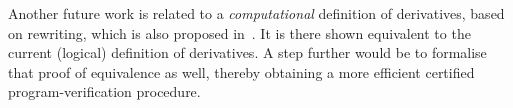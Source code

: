 \documentclass[conference]{IEEEtran}
\newenvironment{todo}{\medskip\hrule\smallskip\noindent}{\smallskip\hrule\medskip}
\newcommand{\dl}[1]{\begin{todo}\textcolor{blue}{Dorel:}\\ \color{red}{#1}\color{black}\end{todo}}
\newcommand{\vr}[1]{\begin{todo}\textcolor{blue}{Vlad:}\\ \color{orange}{#1}\color{black}\end{todo}}
\renewcommand{\aa}[1]{\begin{todo}\textcolor{OliveGreen}{Andrei:}\\ \color{OliveGreen}{#1}\color{black}\end{todo}}
\newcommand{\dl}[1]{}
\newcommand{\vr}[1]{}
\renewcommand{\aa}[1]{}
\newcommand{\F}{\mathcal{F}}
\newcommand{\RL}{\textsc{rl}\xspace}
\newcommand{\coq}[1]{{\small \textit{#1}}}
\begin{document}
Another future work is related to a \emph{computational}  definition of derivatives, based  on rewriting, which is also proposed in~\cite{lucanu-rusu-arusoaie-nowak-LRC2015}. It is there shown equivalent to the current (logical) definition of derivatives.
A step further would be to formalise that proof of equivalence as well, thereby obtaining a more efficient certified program-verification procedure.

%


%









%
%
\end{document}
